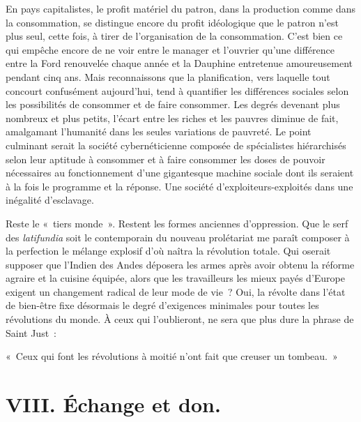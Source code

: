 \documentclass[french,twoside]{book} %
\newenvironment{quoteblock}%
  {\begin{quoting}}
  {\end{quoting}}
\newenvironment{quotebar}{%
    \def\FrameCommand{{\color{rubric!10!}\vrule width 0.5em} \hspace{0.9em}}%
    \def\OuterFrameSep{\itemsep} %
    \MakeFramed {\advance\hsize-\width \FrameRestore}
  }%
  {%
    \endMakeFramed
  }
\renewenvironment{quoteblock}%
  {%
    \savenotes
    \setstretch{0.9}
    \normalfont
    \begin{quotebar}
  }
  {%
    \end{quotebar}
    \spewnotes
  }
\begin{document}
En pays capitalistes, le profit matériel du patron, dans la production comme dans la consommation, se distingue encore du profit idéologique que le patron n’est plus seul, cette fois, à tirer de l’organisation de la consommation. C’est bien ce qui empêche encore de ne voir entre le manager et l’ouvrier qu’une différence entre la Ford renouvelée chaque année et la Dauphine entretenue amoureusement pendant cinq ans. Mais reconnaissons que la planification, vers laquelle tout concourt confusément aujourd’hui, tend à quantifier les différences sociales selon les possibilités de consommer et de faire consommer. Les degrés devenant plus nombreux et plus petits, l’écart entre les riches et les pauvres diminue de fait, amalgamant l’humanité dans les seules variations de pauvreté. Le point culminant serait la société cybernéticienne composée de spécialistes hiérarchisés selon leur aptitude à consommer et à faire consommer les doses de pouvoir nécessaires au fonctionnement d’une gigantesque machine sociale dont ils seraient à la fois le programme et la réponse. Une société d’exploiteurs-exploités dans une inégalité d’esclavage.\par
Reste le « tiers monde ». Restent les formes anciennes d’oppression. Que le serf des \emph{latifundia} soit le contemporain du nouveau prolétariat me paraît composer à la perfection le mélange explosif d’où naîtra la révolution totale. Qui oserait supposer que l’Indien des Andes déposera les armes après avoir obtenu la réforme agraire et la cuisine équipée, alors que les travailleurs les mieux payés d’Europe exigent un changement radical de leur mode de vie ? Oui, la révolte dans l’état de bien-être fixe désormais le degré d’exigences minimales pour toutes les révolutions du monde. À ceux qui l’oublieront, ne sera que plus dure la phrase de Saint Just :\par

\begin{quoteblock}
\noindent « Ceux qui font les révolutions à moitié n’ont fait que creuser un tombeau. »\end{quoteblock}

\section[{VIII. Échange et don.}]{VIII. Échange et don.}\renewcommand{\leftmark}{VIII. Échange et don.}
\end{document}
